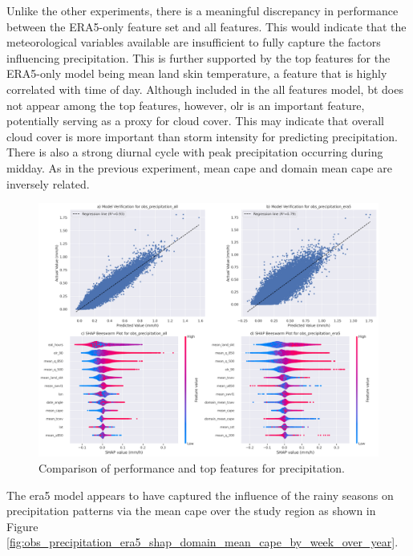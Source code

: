 Unlike the other experiments, there is a meaningful discrepancy in performance between the ERA5-only feature set and all features. This would indicate that the meteorological variables available are insufficient to fully capture the factors influencing precipitation. This is further supported by the top features for the ERA5-only model being mean land skin temperature, a feature that is highly correlated with time of day. Although included in the all features model, \acrfull{bt} does not appear among the top features, however, \acrfull{olr} is an important feature, potentially serving as a proxy for cloud cover. This may indicate that overall cloud cover is more important than storm intensity for predicting precipitation. There is also a strong diurnal cycle with peak precipitation occurring during midday. As in the previous experiment, mean \acrshort{cape} and domain mean \acrshort{cape} are inversely related.

\begin{figure}[ht]
    \centering
    \includegraphics[width=\textwidth]{../figures/generated/experiments/obs_precipitation/obs_precipitation_summary.png}
    \caption{Comparison of performance and top features for precipitation.}
    \label{fig:obs_precipitation_summary}
\end{figure}

The \acrshort{era5} model appears to have captured the influence of the rainy seasons  on precipitation patterns via the mean \acrshort{cape} over the study region as shown in Figure \ref{fig:obs_precipitation_era5_shap_domain_mean_cape_by_week_over_year}.

